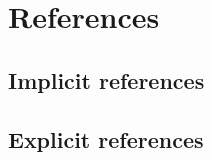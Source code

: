 \chapter{References}\label{chapter:references}

\section{Implicit references}

\section{Explicit references}

